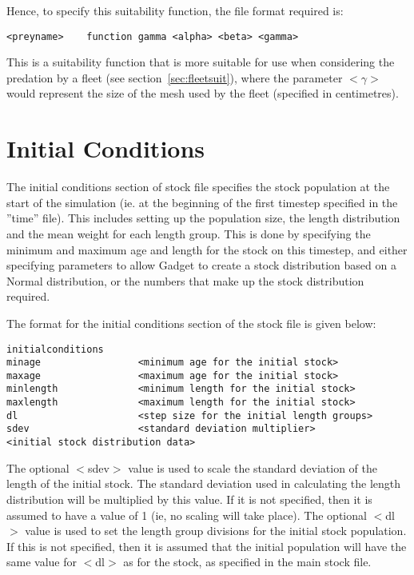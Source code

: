 \documentclass[10pt,twoside]{book}
\begin{document}
Hence, to specify this suitability function, the file format required is:

{\small\begin{verbatim}
<preyname>    function gamma <alpha> <beta> <gamma>
\end{verbatim}}

This is a suitability function that is more suitable for use when considering the predation by a fleet (see section~\ref{sec:fleetsuit}), where the parameter $<\gamma>$ would represent the size of the mesh used by the fleet (specified in centimetres).

\section{Initial Conditions}\label{sec:stockinitial}
The initial conditions section of stock file specifies the stock population at the start of the simulation (ie. at the beginning of the first timestep specified in the ''time'' file).  This includes setting up the population size, the length distribution and the mean weight for each length group.  This is done by specifying the minimum and maximum age and length for the stock on this timestep, and either specifying parameters to allow Gadget to create a stock distribution based on a Normal distribution, or the numbers that make up the stock distribution required.

\bigskip
The format for the initial conditions section of the stock file is given below:

{\small\begin{verbatim}
initialconditions
minage                 <minimum age for the initial stock>
maxage                 <maximum age for the initial stock>
minlength              <minimum length for the initial stock>
maxlength              <maximum length for the initial stock>
dl                     <step size for the initial length groups>
sdev                   <standard deviation multiplier>
<initial stock distribution data>
\end{verbatim}}

The optional $<$sdev$>$ value is used to scale the standard deviation of the length of the initial stock.  The standard deviation used in calculating the length distribution will be multiplied by this value.  If it is not specified, then it is assumed to have a value of 1 (ie, no scaling will take place).  The optional $<$dl$>$ value is used to set the length group divisions for the initial stock population.  If this is not specified, then it is assumed that the initial population will have the same value for $<$dl$>$ as for the stock, as specified in the main stock file.
\end{document}
